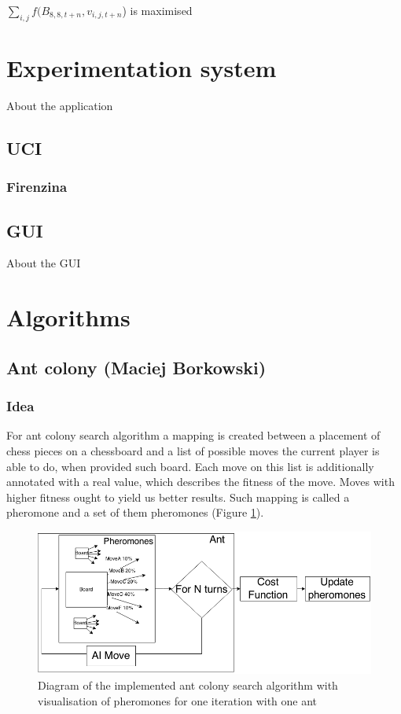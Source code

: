 \documentclass[pdftex]{article}
\begin{document}
$\sum_{i,j} f(B_{8,8,t+n},v_{i,j,t+n}$) is maximised

\section{Experimentation system}
\label{sec:project}

About the application

\subsection{UCI}
\label{sec:uci}

\subsubsection{Firenzina}
\label{sec:firenzina}

\subsection{GUI}
\label{sec:uci}

About the GUI

\section{Algorithms}
\label{sec:project}

\subsection{Ant colony (Maciej Borkowski)}
\label{sec:ant}

\subsubsection{Idea}
For ant colony search algorithm a mapping is created between a placement of chess pieces on a chessboard and a list of possible moves the current player is able to do, when provided such board. Each move on this list is additionally annotated with a real value, which describes the fitness of the move. Moves with higher fitness ought to yield us better results. Such mapping is called a pheromone and a set of them pheromones (Figure \ref{fig:pheromones}).

\begin{figure}[!htb]
	\centering
	\includegraphics[width=1\textwidth]{ant/pheromones.png} 
	\caption{Diagram of the implemented ant colony search algorithm with visualisation of pheromones for one iteration with one ant}
	\label{fig:pheromones}
\end{figure}
\end{document}
